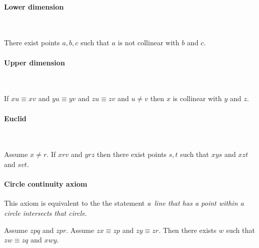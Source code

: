 \documentclass{article}
\newcommand{\Cong}[4]{#1 #2 \equiv #3 #4}
\newcommand{\Betw}[3]{#1 #2 #3}
\begin{document}
  \paragraph{Lower dimension}\

  \begin{forthel}
    \begin{axiom}[A8]
      There exist points $a,b,c$ such that
      $a$ is not collinear with $b$ and $c$.
    \end{axiom}
  \end{forthel}


  \paragraph{Upper dimension}\

  \begin{forthel}
    \begin{axiom}[A9]
      If $\Cong{x}{u}{x}{v}$ and $\Cong{y}{u}{y}{v}$
      and $\Cong{z}{u}{z}{v}$ and $u \neq v$
      then $x$ is collinear with $y$ and $z$.
    \end{axiom}
  \end{forthel}


  \paragraph{Euclid}\

  \begin{forthel}
    \begin{axiom}[A10]
      Assume $x \neq r$.
      If $\Betw{x}{r}{v}$ and $\Betw{y}{r}{z}$
      then there exist points $s,t$ such that
      $\Betw{x}{y}{s}$ and $\Betw{x}{z}{t}$ and $\Betw{s}{v}{t}$.
    \end{axiom}
  \end{forthel}


  \paragraph{Circle continuity axiom}
  This axiom is equivalent to the the statement
  \textit{a~line that has a point within a circle intersects that circle}.

  \begin{forthel}
    \begin{axiom}[CA]
      Assume $\Betw{z}{p}{q}$ and $\Betw{z}{p}{r}$.
      Assume $\Cong{z}{x}{z}{p}$ and $\Cong{z}{y}{z}{r}$.
      Then there exists $w$ such that $\Cong{z}{w}{z}{q}$ and $\Betw{x}{w}{y}$.
    \end{axiom}
  \end{forthel}
\end{document}
